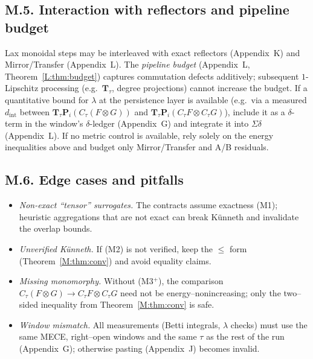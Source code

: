 \documentclass[11pt]{article}
\DeclareRobustCommand{\hyp}{\nobreakdash-}
\numberwithin{equation}{section}
\theoremstyle{definition}
\begin{document}
\subsection*{M.5. Interaction with reflectors and pipeline budget}
Lax monoidal steps may be interleaved with exact reflectors (Appendix~K) and Mirror/Transfer (Appendix~L). The \emph{pipeline budget} (Appendix~L, Theorem~\ref{L:thm:budget}) captures commutation defects additively; subsequent \(1\)\hyp Lipschitz processing (e.g.\ \(\mathbf{T}_\tau\), degree projections) cannot increase the budget.
If a quantitative bound for \(\lambda\) at the persistence layer is available (e.g.\ via a measured \(d_{\mathrm{int}}\) between \(\mathbf{T}_\tau\mathbf{P}_i(C_\tau(F\otimes G))\) and \(\mathbf{T}_\tau\mathbf{P}_i(C_\tau F\otimes C_\tau G)\)), include it as a \(\delta\)\hyp term in the window’s \(\delta\)\hyp ledger (Appendix~G) and integrate it into \(\Sigma\delta\) (Appendix~L). If no metric control is available, rely solely on the energy inequalities above and budget only Mirror/Transfer and A/B residuals.

\subsection*{M.6. Edge cases and pitfalls}
\begin{itemize}\itemsep0.25em
  \item \emph{Non\hyp exact ``tensor'' surrogates.} The contracts assume exactness (M1); heuristic aggregations that are not exact can break Künneth and invalidate the overlap bounds.
  \item \emph{Unverified Künneth.} If (M2) is not verified, keep the \(\le\) form (Theorem~\ref{M:thm:conv}) and avoid equality claims.
  \item \emph{Missing monomorphy.} Without (M3$^{+}$), the comparison \(C_\tau(F\otimes G)\to C_\tau F\otimes C_\tau G\) need not be energy–nonincreasing; only the two–sided inequality from Theorem~\ref{M:thm:conv} is safe.
  \item \emph{Window mismatch.} All measurements (Betti integrals, \(\lambda\) checks) must use the same MECE, right–open windows and the same \(\tau\) as the rest of the run (Appendix~G); otherwise pasting (Appendix~J) becomes invalid.
\end{itemize}

\end{document}
